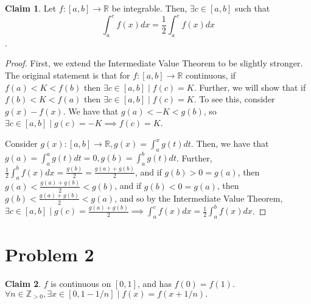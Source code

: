 \documentclass[12pt,letterpaper]{article}
\theoremstyle{definition}
\newtheorem*{claim}{Claim}
\newcommand{\R}{\mathbb{R}}
\newcommand{\Zg}{\mathbb{Z}_{>0}}
\begin{document}
\begin{claim}
  Let $f: [a,b] \rightarrow \R$ be integrable. Then, $\exists c \in [a,b]$ such
  that
  \[
    \int_a^cf(x)dx = \frac{1}{2}\int_a^cf(x)dx
  \].
\end{claim}

\begin{proof}

  First, we extend the Intermediate Value Theorem to be slightly stronger. The
  original statement is that for
  $f: [a,b] \rightarrow \R$ continuous, if $f(a) < K < f(b)$ then $\exists c \in
  [a,b] \mid f(c) = K$. Further, we will show that if $f(b) < K < f(a)$ then
  $\exists c \in [a,b] \mid f(c) = K$. To see this, consider $g(x) -f(x)$. We
  have that $g(a) < -K < g(b)$, so $\exists c \in [a,b] \mid g(c) = -K \implies
  f(c) = K$.
  
  Consider $g(x) : [a,b] \rightarrow \R, g(x) = \int_a^xg(t)dt$. Then, we have
  that $g(a) = \int_a^ag(t)dt = 0, g(b) = \int_a^bg(t)dt$. Further, $\frac{1}{2}
  \int_a^bf(x)dx = \frac{g(b)}{2} = \frac{g(a) + g(b)}{2}$, and if $g(b) > 0 = g(a)$, then $g(a) <
  \frac{g(a) + g(b)}{2} < g(b)$, and if $g(b) < 0 = g(a)$, then $g(b) <
  \frac{g(a) + g(b)}{2} < g(a)$, and so by the Intermediate Value Theorem,
  $\exists c \in [a,b] \mid g(c) = \frac{g(a) + g(b)}{2} \implies \int_a^cf(x)dx
    = \frac{1}{2}\int_a^bf(x)dx$.
\end{proof}

\section*{Problem 2}

\begin{claim}
  $f$ is continuous on $[0,1]$, and has $f(0) = f(1)$. $\forall n \in \Zg,
  \exists x \in [0,1 - 1/n] \mid f(x) = f(x + 1/n).$
\end{claim}
\end{document}
